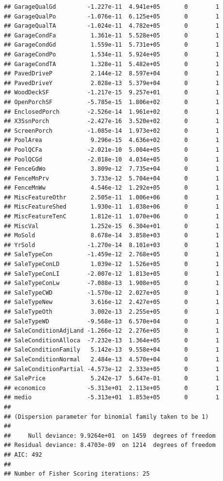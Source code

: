 \documentclass[
]{article}
\begin{document}
\begin{verbatim}
## GarageQualGd         -1.227e-11  4.941e+05       0        1
## GarageQualPo         -1.076e-11  6.125e+05       0        1
## GarageQualTA         -1.024e-11  4.782e+05       0        1
## GarageCondFa          1.361e-11  5.528e+05       0        1
## GarageCondGd          1.559e-11  5.731e+05       0        1
## GarageCondPo          1.534e-11  5.924e+05       0        1
## GarageCondTA          1.328e-11  5.482e+05       0        1
## PavedDriveP           2.144e-12  8.597e+04       0        1
## PavedDriveY           2.028e-13  5.379e+04       0        1
## WoodDeckSF           -1.217e-15  9.257e+01       0        1
## OpenPorchSF          -5.785e-15  1.806e+02       0        1
## EnclosedPorch        -2.526e-14  1.961e+02       0        1
## X3SsnPorch           -2.427e-16  3.520e+02       0        1
## ScreenPorch          -1.085e-14  1.973e+02       0        1
## PoolArea              9.296e-15  4.636e+02       0        1
## PoolQCFa             -2.021e-10  5.004e+05       0        1
## PoolQCGd             -2.018e-10  4.034e+05       0        1
## FenceGdWo             3.809e-12  7.735e+04       0        1
## FenceMnPrv            3.733e-12  5.704e+04       0        1
## FenceMnWw             4.546e-12  1.292e+05       0        1
## MiscFeatureOthr       2.505e-11  1.006e+06       0        1
## MiscFeatureShed       1.930e-11  1.038e+06       0        1
## MiscFeatureTenC       1.812e-11  1.070e+06       0        1
## MiscVal               1.252e-15  6.304e+01       0        1
## MoSold                8.678e-14  3.858e+03       0        1
## YrSold               -1.270e-14  8.101e+03       0        1
## SaleTypeCon          -1.459e-12  2.768e+05       0        1
## SaleTypeConLD         1.039e-12  1.526e+05       0        1
## SaleTypeConLI        -2.007e-12  1.813e+05       0        1
## SaleTypeConLw        -7.088e-13  1.908e+05       0        1
## SaleTypeCWD          -1.570e-12  2.027e+05       0        1
## SaleTypeNew           3.616e-12  2.427e+05       0        1
## SaleTypeOth           3.002e-13  2.255e+05       0        1
## SaleTypeWD           -9.568e-13  6.570e+04       0        1
## SaleConditionAdjLand -1.266e-12  2.276e+05       0        1
## SaleConditionAlloca  -7.232e-13  1.364e+05       0        1
## SaleConditionFamily   5.142e-13  9.558e+04       0        1
## SaleConditionNormal   2.484e-13  4.570e+04       0        1
## SaleConditionPartial -4.573e-12  2.333e+05       0        1
## SalePrice             5.242e-17  5.647e-01       0        1
## economico            -5.313e+01  2.113e+05       0        1
## medio                -5.313e+01  1.853e+05       0        1
## 
## (Dispersion parameter for binomial family taken to be 1)
## 
##     Null deviance: 9.9264e+01  on 1459  degrees of freedom
## Residual deviance: 8.4703e-09  on 1214  degrees of freedom
## AIC: 492
## 
## Number of Fisher Scoring iterations: 25
\end{verbatim}
\end{document}
